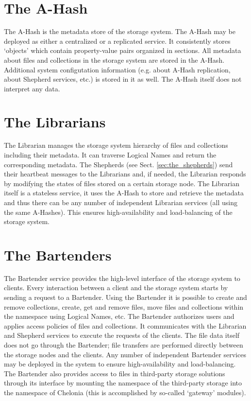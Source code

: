 \documentclass{book}
\begin{document}

\section{The A-Hash} %
\label{sec:the_a_hash}

The A-Hash is the metadata store of the storage system. The A-Hash may be deployed as either a centralized or a replicated service. It consistently stores `objects' which contain property-value pairs organized in sections. All metadata about files and collections in the storage system are stored in the A-Hash. Additional system configutation information (e.g. about A-Hash replication, about Shepherd services, etc.) is stored in it as well. The A-Hash itself does not interpret any data.


\section{The Librarians} %
\label{sec:the_librarians}

The Librarian manages the storage system hierarchy of files and collections including their metadata. It can traverse Logical Names and return the corresponding metadata. The Shepherds (see Sect. \ref{sec:the_shepherds}) send their heartbeat messages to the Librarians and, if needed, the Librarian responds by modifying the states of files stored on a certain storage node. The Librarian itself is a stateless service, it uses the A-Hash to store and retrieve the metadata and thus there can be any number of independent Librarian services (all using the same A-Hashes). This ensures high-availability and load-balancing of the storage system.


\section{The Bartenders} %
\label{sec:the_bartenders}

The Bartender service provides the high-level interface of the storage system to clients. Every interaction between a client and the storage system starts by sending a request to a Bartender. Using the Bartender it is possible to create and remove collections, create, get and remove files, move files and collections within the namespace using Logical Names, etc. The Bartender authorizes users and applies access policies of files and collections. It communicates with the Librarian and Shepherd services to execute the requests of the clients. The file data itself does not go through the Bartender; file transfers are performed directly between the storage nodes and the clients. Any number of independent Bartender services may be deployed in the system to ensure high-availability and load-balancing. The Bartender also provides access to files in third-party storage solutions through its interface by mounting the namespace of the third-party storage into the namespace of Chelonia (this is accomplished by so-called `gateway' modules). 
\end{document}
